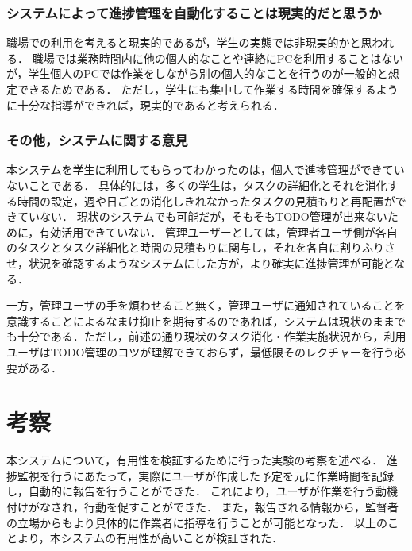 \subsubsection{システムによって進捗管理を自動化することは現実的だと思うか}
職場での利用を考えると現実的であるが，学生の実態では非現実的かと思われる．
職場では業務時間内に他の個人的なことや連絡にPCを利用することはないが，学生個人のPCでは作業をしながら別の個人的なことを行うのが一般的と想定できるためである．
ただし，学生にも集中して作業する時間を確保するように十分な指導ができれば，現実的であると考えられる．

\subsubsection{その他，システムに関する意見}
本システムを学生に利用してもらってわかったのは，個人で進捗管理ができていないことである．
具体的には，多くの学生は，タスクの詳細化とそれを消化する時間の設定，週や日ごとの消化しきれなかったタスクの見積もりと再配置ができていない．
現状のシステムでも可能だが，そもそもTODO管理が出来ないために，有効活用できていない．
管理ユーザーとしては，管理者ユーザ側が各自のタスクとタスク詳細化と時間の見積もりに関与し，それを各自に割りふりさせ，状況を確認するようなシステムにした方が，より確実に進捗管理が可能となる．

一方，管理ユーザの手を煩わせること無く，管理ユーザに通知されていることを意識することによるなまけ抑止を期待するのであれば，システムは現状のままでも十分である．ただし，前述の通り現状のタスク消化・作業実施状況から，利用ユーザはTODO管理のコツが理解できておらず，最低限そのレクチャーを行う必要がある．

\section{考察}
本システムについて，有用性を検証するために行った実験の考察を述べる．
進捗監視を行うにあたって，実際にユーザが作成した予定を元に作業時間を記録し，自動的に報告を行うことができた．
これにより，ユーザが作業を行う動機付けがなされ，行動を促すことができた．
また，報告される情報から，監督者の立場からもより具体的に作業者に指導を行うことが可能となった．
以上のことより，本システムの有用性が高いことが検証された．
